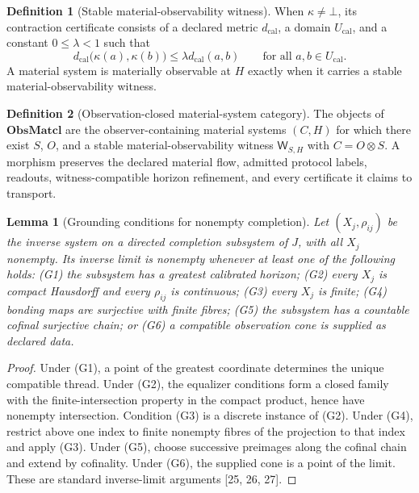 \documentclass[11pt]{article}
\newtheorem{lemma}{Lemma}
\theoremstyle{definition}
\newtheorem{definition}{Definition}
\newcommand{\ObsMatcl}{\mathbf{ObsMatcl}}
\begin{document}
\begin{definition}[Stable material-observability witness]
When \(\kappa\neq\bot\), its contraction certificate consists of a declared
metric \(d_{\mathrm{cal}}\), a domain \(U_{\mathrm{cal}}\), and a constant
\(0\leq\lambda<1\) such that
\[
d_{\mathrm{cal}}\bigl(\kappa(a),\kappa(b)\bigr)
\leq
\lambda d_{\mathrm{cal}}(a,b)
\qquad
\text{for all }a,b\in U_{\mathrm{cal}}.
\]
A material system is materially observable at \(H\) exactly when it carries a
stable material-observability witness.
\end{definition}

\begin{definition}[Observation-closed material-system category]
\label{def:obsmat}
The objects of \(\ObsMatcl\) are the observer-containing material systems
\((C,H)\) for which there exist \(S\), \(O\), and a stable
material-observability witness \(\mathsf{W}_{S,H}\) with \(C=O\otimes S\).
A morphism preserves the declared material flow, admitted protocol labels,
readouts, witness-compatible horizon refinement, and every certificate it
claims to transport.
\end{definition}


\begin{lemma}[Grounding conditions for nonempty completion]
\label{lem:grounding}
Let $(X_j, \rho_{ij})$ be the inverse system on a directed completion subsystem of $J$, with all $X_j$ nonempty. Its inverse limit is nonempty whenever at least one of the following holds: (G1) the subsystem has a greatest calibrated horizon; (G2) every $X_j$ is compact Hausdorff and every $\rho_{ij}$ is continuous; (G3) every $X_j$ is finite; (G4) bonding maps are surjective with finite fibres; (G5) the subsystem has a countable cofinal surjective chain; or (G6) a compatible observation cone is supplied as declared data.
\end{lemma}

\begin{proof}
Under (G1), a point of the greatest coordinate determines the unique compatible thread. Under (G2), the equalizer conditions form a closed family with the finite-intersection property in the compact product, hence have nonempty intersection. Condition (G3) is a discrete instance of (G2). Under (G4), restrict above one index to finite nonempty fibres of the projection to that index and apply (G3). Under (G5), choose successive preimages along the cofinal chain and extend by cofinality. Under (G6), the supplied cone is a point of the limit. These are standard inverse-limit arguments [25, 26, 27].
\end{proof}
\end{document}
